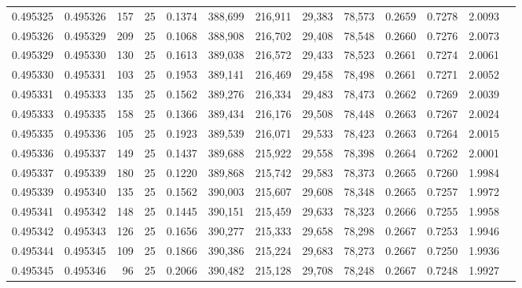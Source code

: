 \begin{tabular}{rrrrrrrrrrrrr}
0.495325 & 0.495326 &   157 &  25 &                                     0.1374 & 388,699 & 216,911 &  29,383 &  78,573 & 0.2659 & 0.7278 & 2.0093 \\
0.495326 & 0.495329 &   209 &  25 &                                     0.1068 & 388,908 & 216,702 &  29,408 &  78,548 & 0.2660 & 0.7276 & 2.0073 \\
0.495329 & 0.495330 &   130 &  25 &                                     0.1613 & 389,038 & 216,572 &  29,433 &  78,523 & 0.2661 & 0.7274 & 2.0061 \\
0.495330 & 0.495331 &   103 &  25 &                                     0.1953 & 389,141 & 216,469 &  29,458 &  78,498 & 0.2661 & 0.7271 & 2.0052 \\
0.495331 & 0.495333 &   135 &  25 &                                     0.1562 & 389,276 & 216,334 &  29,483 &  78,473 & 0.2662 & 0.7269 & 2.0039 \\
0.495333 & 0.495335 &   158 &  25 &                                     0.1366 & 389,434 & 216,176 &  29,508 &  78,448 & 0.2663 & 0.7267 & 2.0024 \\
0.495335 & 0.495336 &   105 &  25 &                                     0.1923 & 389,539 & 216,071 &  29,533 &  78,423 & 0.2663 & 0.7264 & 2.0015 \\
0.495336 & 0.495337 &   149 &  25 &                                     0.1437 & 389,688 & 215,922 &  29,558 &  78,398 & 0.2664 & 0.7262 & 2.0001 \\
0.495337 & 0.495339 &   180 &  25 &                                     0.1220 & 389,868 & 215,742 &  29,583 &  78,373 & 0.2665 & 0.7260 & 1.9984 \\
0.495339 & 0.495340 &   135 &  25 &                                     0.1562 & 390,003 & 215,607 &  29,608 &  78,348 & 0.2665 & 0.7257 & 1.9972 \\
0.495341 & 0.495342 &   148 &  25 &                                     0.1445 & 390,151 & 215,459 &  29,633 &  78,323 & 0.2666 & 0.7255 & 1.9958 \\
0.495342 & 0.495343 &   126 &  25 &                                     0.1656 & 390,277 & 215,333 &  29,658 &  78,298 & 0.2667 & 0.7253 & 1.9946 \\
0.495344 & 0.495345 &   109 &  25 &                                     0.1866 & 390,386 & 215,224 &  29,683 &  78,273 & 0.2667 & 0.7250 & 1.9936 \\
0.495345 & 0.495346 &    96 &  25 &                                     0.2066 & 390,482 & 215,128 &  29,708 &  78,248 & 0.2667 & 0.7248 & 1.9927 \\

\end{tabular}
